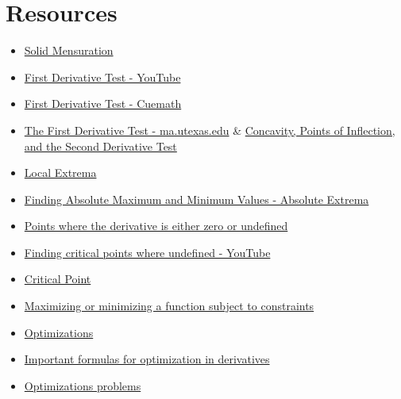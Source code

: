 \documentclass{article}
\begin{document}
\section*{Resources}
\begin{itemize}
    \item \href{https://explorer.globe.engineer/?q=SOLID+MENSURATION}{Solid Mensuration}
    \item \href{https://www.youtube.com/watch?v=9W4ejz0EMtE}{First Derivative Test - YouTube}
    \item \href{https://www.cuemath.com/calculus/first-derivative-test/}{First Derivative Test - Cuemath}
    \item \href{https://web.ma.utexas.edu/users/m408n/CurrentWeb/LM4-3-5.php}{The First Derivative Test - ma.utexas.edu} \& \href{https://web.ma.utexas.edu/users/m408n/AS-back-up/LM4-3-10.html}{Concavity, Points of Inflection, and the Second Derivative Test}
    \item \href{https://math.libretexts.org/Courses/University_of_California_Davis/UCD_Mat_21A%3A_Differential_Calculus/4%3A_Applications_of_Definite_Integrals/4.1%3A_Extreme_Values_of_Functions}{Local Extrema}
    \item \href{https://www.youtube.com/watch?app=desktop&v=3wrXDw5ETh4}{Finding Absolute Maximum and Minimum Values - Absolute Extrema }
    \item \href{https://www.kristakingmath.com/blog/critical-points-first-derivative-test}{Points where the derivative is either zero or undefined}
    \item \href{https://www.youtube.com/watch?app=desktop&v=P7SFDGCC3sE}{Finding critical points where undefined - YouTube}
    \item \href{https://testbook.com/maths/critical-point}{Critical Point}
    \item \href{https://www.bartleby.com/subject/math/calculus/concepts/minimization}{Maximizing or minimizing a function subject to constraints}
    \item \href{https://www.whitman.edu/mathematics/calculus_online/section06.01.html}{Optimizations}
    \item \href{https://explorer.globe.engineer/?q=important+formulas+for+optimization+in+derivatives}{Important formulas for optimization in derivatives}
    \item \href{https://openstax.org/books/calculus-volume-1/pages/4-7-applied-optimization-problems}{Optimizations problems}
\end{itemize}
\end{document}
